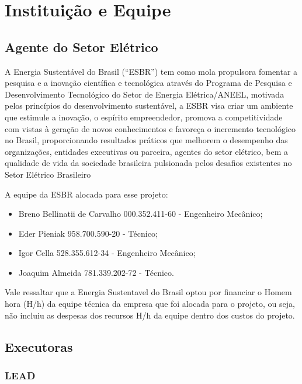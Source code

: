 \section{Instituição e Equipe}


\subsection{Agente do Setor Elétrico} 

A Energia Sustentável do Brasil (“ESBR”) tem como mola propulsora fomentar a
pesquisa e a inovação científica e tecnológica através do Programa de Pesquisa e
Desenvolvimento Tecnológico do Setor de Energia Elétrica/ANEEL, motivada pelos
princípios do desenvolvimento sustentável, a ESBR visa criar um ambiente que
estimule a inovação, o espírito empreendedor, promova a competitividade com
vistas à geração de novos conhecimentos e favoreça o incremento tecnológico no
Brasil, proporcionando resultados práticos que melhorem o desempenho das
organizações, entidades executivas ou parceira, agentes do setor elétrico, bem a
qualidade de vida da sociedade brasileira pulsionada pelos desafios existentes
no Setor Elétrico Brasileiro

A equipe da ESBR alocada para esse projeto:

\begin{itemize}
  \item Breno Bellinatii de Carvalho 000.352.411-60 - Engenheiro Mecânico;
  \item Eder Pieniak 958.700.590-20 - Técnico;
  \item Igor Cella 528.355.612-34 - Engenheiro Mecânico;
  \item Joaquim Almeida 781.339.202-72 - Técnico.
\end{itemize}

Vale ressaltar que a  Energia Sustentavel do Brasil  optou por financiar o Homem
hora (H/h) da equipe técnica da empresa que foi alocada para o projeto, ou seja,
não incluiu as despesas dos recursos H/h da equipe dentro dos custos do projeto.

\subsection{Executoras}

\subsubsection{ \textbf{LEAD} } 

